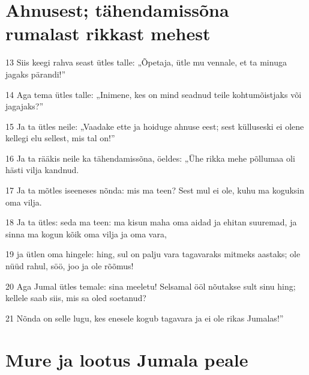 \section*{Ahnusest; tähendamissõna rumalast rikkast mehest}

\par 13 Siis keegi rahva seast ütles talle: „Õpetaja, ütle mu vennale, et ta minuga jagaks pärandi!”
\par 14 Aga tema ütles talle: „Inimene, kes on mind seadnud teile kohtumõistjaks või jagajaks?”
\par 15 Ja ta ütles neile: „Vaadake ette ja hoiduge ahnuse eest; sest külluseski ei olene kellegi elu sellest, mis tal on!”
\par 16 Ja ta rääkis neile ka tähendamissõna, öeldes: „Ühe rikka mehe põllumaa oli hästi vilja kandnud.
\par 17 Ja ta mõtles iseeneses nõnda: mis ma teen? Sest mul ei ole, kuhu ma koguksin oma vilja.
\par 18 Ja ta ütles: seda ma teen: ma kisun maha oma aidad ja ehitan suuremad, ja sinna ma kogun kõik oma vilja ja oma vara,
\par 19 ja ütlen oma hingele: hing, sul on palju vara tagavaraks mitmeks aastaks; ole nüüd rahul, söö, joo ja ole rõõmus!
\par 20 Aga Jumal ütles temale: sina meeletu! Selsamal ööl nõutakse sult sinu hing; kellele saab siis, mis sa oled soetanud?
\par 21 Nõnda on selle lugu, kes enesele kogub tagavara ja ei ole rikas Jumalas!”

\section*{Mure ja lootus Jumala peale}

